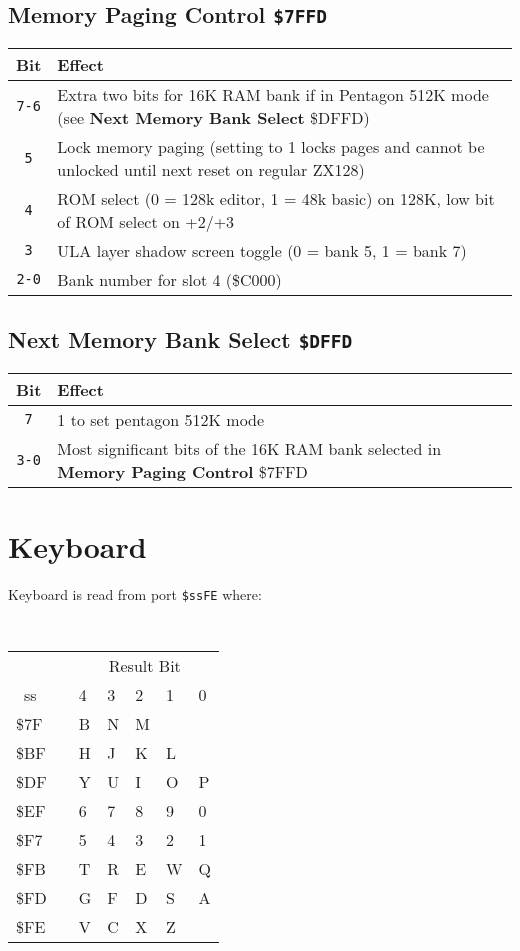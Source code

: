 \documentclass[twoside,openright,a4paper]{book}
\newcommand{\instrt}{\rule{0pt}{2.7ex}}
\newcommand{\instrb}{\rule[-1.7ex]{0pt}{0pt}}
\newcommand{\notet}{\rule{0pt}{2.4ex}}
\begin{document}
\subsection{Memory Paging Control {\tt \$7FFD}}

\begin{tabular}{cp{12cm}}
	Bit & Effect \\
	\hline
	{\tt 7-6}\notet & 
		Extra two bits for 16K RAM bank if in Pentagon 512K mode (see \textbf{Next Memory Bank Select} \$DFFD) \\
	{\tt 5}\notet &
		Lock memory paging (setting to 1 locks pages and cannot be unlocked until next reset on regular ZX128) \\
	{\tt 4}\notet &
		ROM select (0 = 128k editor, 1 = 48k basic) on 128K, low bit of ROM select on +2/+3 \\
	{\tt 3}\notet &
		ULA layer shadow screen toggle (0 = bank 5, 1 = bank 7) \\
	{\tt 2-0}\notet &
		Bank number for slot 4 (\$C000) \\
\end{tabular}

\subsection{Next Memory Bank Select {\tt \$DFFD}}

\begin{tabular}{cp{12cm}}
	Bit & Effect \\
	\hline
	{\tt 7}\notet & 
		1 to set pentagon 512K mode \\
	{\tt 3-0}\notet &
		Most significant bits of the 16K RAM bank selected in \textbf{Memory Paging Control} \$7FFD  \\
\end{tabular}


\section{Keyboard}
\label{zx_next_keyboard}

Keyboard is read from port {\tt \$ssFE} where:

{\tt 
	\begin{tabular}{p{0.7cm}|cp{1cm}p{1cm}p{1cm}p{1.2cm}p{1.2cm}}

		   & & \multicolumn{5}{c}{Result Bit} \\
		~ss & & 4 & 3 & 2 & 1 & 0 \instrb \\
		\hline
		\$7F\instrt & & B & N & M & \fbox{Symb} & \fbox{Space} \\
		\$BF\instrt & & H & J & K & L & \fbox{Enter} \\
		\$DF\instrt & & Y & U & I & O & P \\
		\$EF\instrt & & 6 & 7 & 8 & 9 & 0 \\
		\$F7\instrt & & 5 & 4 & 3 & 2 & 1 \\
		\$FB\instrt & & T & R & E & W & Q \\
		\$FD\instrt & & G & F & D & S & A \\
		\$FE\instrt\instrb & & V & C & X & Z & \fbox{Caps} \\

	\end{tabular}
}
\end{document}
